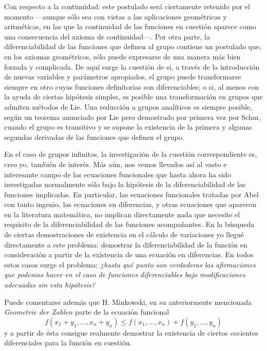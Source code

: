 \documentclass[a4paper, 12pt]{article}
\begin{document}
Con respecto a la continuidad: este postulado será ciertamente retenido por el momento \mbox{---aunque} sólo sea con vistas a las aplicaciones geométricas y aritméticas, en las que la continuidad de las funciones en cuestión aparece como una consecuencia del axioma de continuidad---. Por otra parte, la diferenciabilidad de las funciones que definen al grupo contiene un postulado que, en los axiomas geométricos, sólo puede expresarse de una manera más bien forzada y complicada. De aquí surge la cuestión de si, a través de la introducción de nuevas variables y parámetros apropiados, el grupo puede transformarse siempre en otro cuyas funciones definitorias son diferenciables; o si, al menos con la ayuda de ciertas hipótesis simples, es posible una transformación en grupos que admiten métodos de Lie. Una reducción a grupos analíticos es siempre posible, según un teorema anunciado por Lie pero demostrado por primera vez por Schur, cuando el grupo es transitivo y se supone la existencia de la primera y algunas segundas derivadas de las funciones que definen el grupo.


 
En el caso de grupos infinitos, la investigación de la cuestión correspondiente es, creo yo, también de interés. Más aún, nos vemos llevados así al vasto e interesante campo de las ecuaciones funcionales que hasta ahora ha sido investigadas normalmente sólo bajo la hipótesis de la diferenciabilidad de las funciones implicadas. En particular, las ecuaciones funcionales tratadas por Abel con tanto ingenio, las ecuaciones en diferencias, y otras ecuaciones que aparecen en la literatura matemática, no implican directamente nada que necesite el requisito de la diferenciabilidad de las funciones acompañantes. En la búsqueda de ciertas demostraciones de existencia en el cálculo de variaciones yo llegué directamente a este problema: demostrar la diferenciabilidad de la función en consideración a partir de la existencia de una ecuación en diferencias. En todos estos casos surge el problema: \textit{¿hasta qué punto son verdaderas las afirmaciones que podemos hacer en el caso de funciones diferenciables bajo modificaciones adecuadas sin esta hipótesis?}  

Puede comentarse además que H. Minkowski, en su anteriormente mencionada \textit{Geometrie der Zahlen} parte de la ecuación funcional 
$$
f(x_1+y_1, \dots, x_n+y_n) \leq f(x_1, \dots, x_n)+f(y_1, \dots, y_n)
$$
y a partir de ésta consigue realmente demostrar la existencia de ciertos cocientes diferenciales para la función en cuestión. 
\end{document}
